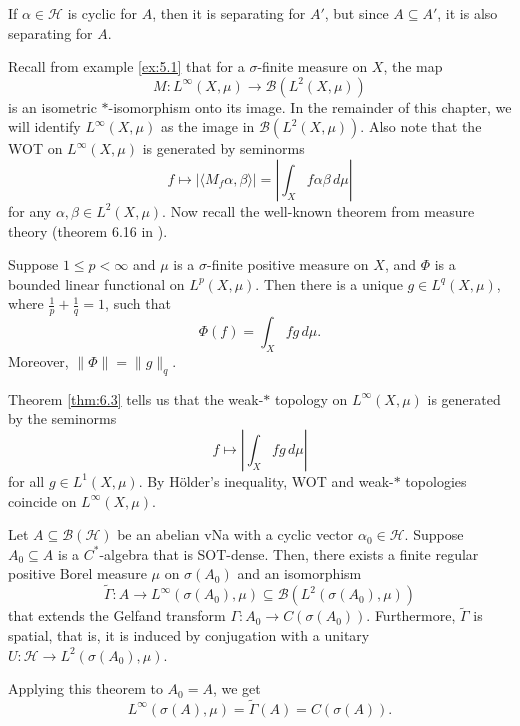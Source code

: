\begin{myproof}
  If $\alpha \in \mathcal{H}$ is cyclic for $A$, then it is separating for $A'$, 
  but since $A \subseteq A'$, it is also separating for $A$.
\end{myproof}

Recall from example \ref{ex:5.1} that for a $\sigma$-finite measure on $X$, the map 
$$M: L^\infty (X, \mu) \to \mathcal{B} (L^2 (X, \mu))$$
is an isometric $*$-isomorphism onto its image. In the remainder of this chapter, we will identify 
$L^\infty(X, \mu)$ as the image in $\mathcal{B} (L^2 (X, \mu))$. Also note that the WOT on $L ^\infty (X, \mu)$
is generated by seminorms 
$$f \mapsto |\langle M_f \alpha, \beta \rangle| = \left| \int_{X} f \alpha \beta\, d\mu \right|$$
for any $\alpha, \beta \in L^2 (X, \mu)$. 
Now recall the well-known theorem from measure theory (theorem 6.16 in \cite{rudin}).

\begin{theorem}\label{thm:6.3}
  Suppose $1 \leq p < \infty$ and $\mu$ is a $\sigma$-finite positive measure on $X$,
  and $\Phi$ is a bounded linear functional on $L^p(X, \mu)$.
  Then there is a unique $g \in L^q(X, \mu)$, where $\frac{1}{p} + \frac{1}{q} = 1$, such that 
  $$\Phi(f) = \int_X f g\, d\mu.$$ Moreover, $\|\Phi\| = \|g\|_q$.
\end{theorem}

Theorem \ref{thm:6.3} tells us that the weak-$*$ topology on $L^\infty (X, \mu)$
is generated by the seminorms 
$$f \mapsto \left|\int_{X} fg\, d\mu \right|$$
for all $g \in L^1 (X, \mu)$. By Hölder's inequality, WOT and weak-$*$ topologies coincide on $L^\infty (X, \mu)$.

\begin{theorem}\label{thm:6.2}
  Let $A \subseteq \mathcal{B}(\mathcal{H})$ be an abelian vNa with a cyclic vector $\alpha_0 \in \mathcal{H}$.
  Suppose $A_0 \subseteq A$ is a $C^*$-algebra that is SOT-dense. Then, there exists a finite regular positive Borel measure 
  $\mu$ on $\sigma(A_0)$ and an isomorphism $$\widetilde{\Gamma}: A \to L^\infty (\sigma (A_0), \mu) \subseteq \mathcal{B} (L^2 (\sigma(A_0), \mu))$$
  that extends the Gelfand transform $\Gamma: A_0 \to C(\sigma(A_0))$.
  Furthermore, $\widetilde{\Gamma}$ is spatial, that is, it is induced by conjugation with a unitary 
  $U: \mathcal{H} \to L^2 (\sigma(A_0), \mu)$.
\end{theorem}

\begin{remark}
  Applying this theorem to $A_0 = A$, we get 
  $$ L^{\infty} (\sigma(A), \mu) = \widetilde{\Gamma} (A) = C(\sigma(A)).$$
\end{remark}

